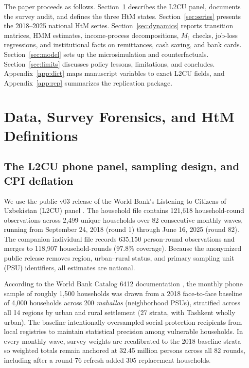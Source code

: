 \documentclass[11pt]{article}
\begin{document}
The paper proceeds as follows. Section~\ref{sec:data} describes the L2CU panel, documents the survey audit, and defines the three HtM states. Section~\ref{sec:series} presents the 2018--2025 national HtM series. Section~\ref{sec:dynamics} reports transition matrices, HMM estimates, income-process decompositions, $M_1$ checks, job-loss regressions, and institutional facts on remittances, cash saving, and bank cards. Section~\ref{sec:model} sets up the microsimulation and counterfactuals. Section~\ref{sec:limits} discusses policy lessons, limitations, and concludes. Appendix~\ref{app:dict} maps manuscript variables to exact L2CU fields, and Appendix~\ref{app:rep} summarizes the replication package.

\section{Data, Survey Forensics, and HtM Definitions}\label{sec:data}

\subsection{The L2CU phone panel, sampling design, and CPI deflation}\label{sec:l2cu}

We use the public v03 release of the World Bank's Listening to Citizens of Uzbekistan (L2CU) panel \citep{WB2025L2CU}. The household file contains 121,618 household-round observations across 2,499 unique households over 82 consecutive monthly waves, running from September 24, 2018 (round 1) through June 16, 2025 (round 82). The companion individual file records 635,150 person-round observations and merges to 118,907 household-rounds (97.8\% coverage). Because the anonymized public release removes region, urban--rural status, and primary sampling unit (PSU) identifiers, all estimates are national.

According to the World Bank Catalog 6412 documentation \citep{WB2025L2CU}, the monthly phone sample of roughly 1,500 households was drawn from a 2018 face-to-face baseline of 4,000 households across 200 \textit{mahallas} (neighborhood PSUs), stratified across all 14 regions by urban and rural settlement (27 strata, with Tashkent wholly urban). The baseline intentionally oversampled social-protection recipients from local registries to maintain statistical precision among vulnerable households. In every monthly wave, survey weights are recalibrated to the 2018 baseline strata so weighted totals remain anchored at 32.45 million persons across all 82 rounds, including after a round-76 refresh added 305 replacement households.
\end{document}
